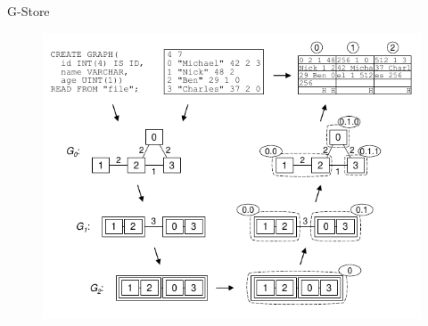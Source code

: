 \documentclass[rgb]{beamer}
\begin{document}
\begin{frame}{G-Store}
            \framebreak
            \begin{figure}[H]
                \begin{center}
                \includegraphics[keepaspectratio, height=0.9\textheight, width=\textwidth]{img/g-store.png}\\
                \end{center}
            \end{figure}
            \vfill\vspace{0pt}
        \end{frame}
        
\end{document}
